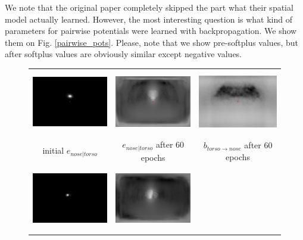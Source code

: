 \documentclass[a4paper,10pt]{article}
\begin{document}
	We note that the original paper completely skipped the part what their spatial model actually learned. However, the most interesting question is what kind of parameters for pairwise potentials were learned with backpropagation. We show them on Fig. \ref{pairwise_pots}. Please, note that we show pre-softplus values, but after softplus values are obviously similar except negative values.
	\begin{figure}[H]
		\begin{tabular}{ccc}
			\includegraphics[height=2.8cm]{img/0epoch_nose_torso.png} & \includegraphics[height=2.8cm]{img/60epoch_nose_torso.png} & \includegraphics[height=2.8cm]{img/60epoch_bias_nose_torso.png} \\
			initial $e_{nose | torso}$ & $e_{nose | torso}$ after 60 epochs & $b_{torso \rightarrow nose}$ after 60 epochs \\
			\includegraphics[height=2.8cm]{img/0epoch_rsho_torso.png} & \includegraphics[height=2.8cm]{img/60epoch_rsho_torso.png} & 

\end{tabular}
\end{figure}
\end{document}
